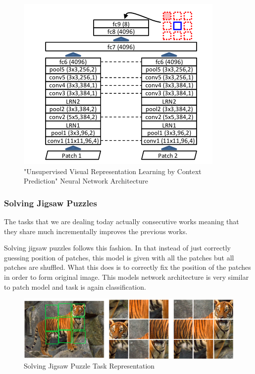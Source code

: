 \documentclass{article}
\begin{document}
\begin{figure}[H]
       \centering
       \includegraphics[width=0.8\linewidth]{figures/proxy_task_context_patch_network.png}
       \caption{"Unsupervised Visual Representation Learning by Context Prediction" \cite{doersch2016unsupervised} Neural Network Architecture}
       \label{fig:patch_model}
       \end{figure}
 
 
\subsubsection{Solving Jigsaw Puzzles}
The tasks that we are dealing today actually consecutive works meaning
that they share much incrementally improves the previous works.
 
Solving jigsaw puzzles follows this fashion.
In that instead of just correctly guessing position of patches,
this model is given with all the patches but all patches are shuffled.
What this does is to correctly fix the position of the patches in order to
form original image. This models network architecture is very similar to
patch model and task is again classification.
 
\begin{figure}[H]
   \centering
   \includegraphics[width=0.8\linewidth]{figures/jigsaw.png}
   \caption{Solving Jigsaw Puzzle Task Representation}
   \label{fig:jigsaw_task}
   \end{figure}
 
\end{document}
